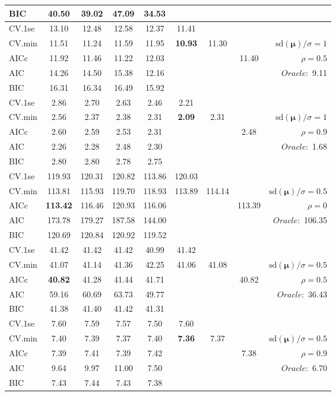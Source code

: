 \begin{table}
\begin{center}
\begin{tabular}{l*{7}{c}|r}
BIC & 40.50 & 39.02 & 47.09 & 34.53 & & & &  \\
 \hline 
CV.1se & 13.10 & 12.48 & 12.58 & 12.37 & 11.41 & & & \\
CV.min & 11.51 & 11.24 & 11.59 & 11.95 & {\bf 10.93} & 11.30 & & $\mathrm{sd}(\mathbf{\mu})/\sigma=1$ \\
AICc & 11.92 & 11.46 & 11.22 & 12.03 & & & 11.40 &  $\rho=0.5$ \\
AIC & 14.26 & 14.50 & 15.38 & 12.16 & & & &  \multirow{2}{*}{$Oracle: $ 9.11} \\
BIC & 16.31 & 16.34 & 16.49 & 15.92 & & & &  \\
 \hline 
CV.1se & 2.86 & 2.70 & 2.63 & 2.46 & 2.21 & & & \\
CV.min & 2.56 & 2.37 & 2.38 & 2.31 & {\bf 2.09} & 2.31 & & $\mathrm{sd}(\mathbf{\mu})/\sigma=1$ \\
AICc & 2.60 & 2.59 & 2.53 & 2.31 & & & 2.48 &  $\rho=0.9$ \\
AIC & 2.26 & 2.28 & 2.48 & 2.30 & & & &  \multirow{2}{*}{$Oracle: $ 1.68} \\
BIC & 2.80 & 2.80 & 2.78 & 2.75 & & & &  \\
 \hline 
CV.1se & 119.93 & 120.31 & 120.82 & 113.86 & 120.03 & & & \\
CV.min & 113.81 & 115.93 & 119.70 & 118.93 & 113.89 & 114.14 & & $\mathrm{sd}(\mathbf{\mu})/\sigma=0.5$ \\
AICc & {\bf 113.42} & 116.46 & 120.93 & 116.06 & & & 113.39 &  $\rho=0$ \\
AIC & 173.78 & 179.27 & 187.58 & 144.00 & & & &  \multirow{2}{*}{$Oracle: $ 106.35} \\
BIC & 120.69 & 120.84 & 120.92 & 119.52 & & & &  \\
 \hline 
CV.1se & 41.42 & 41.42 & 41.42 & 40.99 & 41.42 & & & \\
CV.min & 41.07 & 41.14 & 41.36 & 42.25 & 41.06 & 41.08 & & $\mathrm{sd}(\mathbf{\mu})/\sigma=0.5$ \\
AICc & {\bf 40.82} & 41.28 & 41.44 & 41.71 & & & 40.82 &  $\rho=0.5$ \\
AIC & 59.16 & 60.69 & 63.73 & 49.77 & & & &  \multirow{2}{*}{$Oracle: $ 36.43} \\
BIC & 41.38 & 41.40 & 41.42 & 41.31 & & & &  \\
 \hline 
CV.1se & 7.60 & 7.59 & 7.57 & 7.50 & 7.60 & & & \\
CV.min & 7.40 & 7.39 & 7.37 & 7.40 & {\bf 7.36} & 7.37 & & $\mathrm{sd}(\mathbf{\mu})/\sigma=0.5$ \\
AICc & 7.39 & 7.41 & 7.39 & 7.42 & & & 7.38 &  $\rho=0.9$ \\
AIC & 9.64 & 9.97 & 11.00 & 7.50 & & & &  \multirow{2}{*}{$Oracle: $ 6.70} \\
BIC & 7.43 & 7.44 & 7.43 & 7.38 & & & &  \\
 \hline 
\end{tabular}
\end{center}
\vspace{-1cm}
\end{table}




